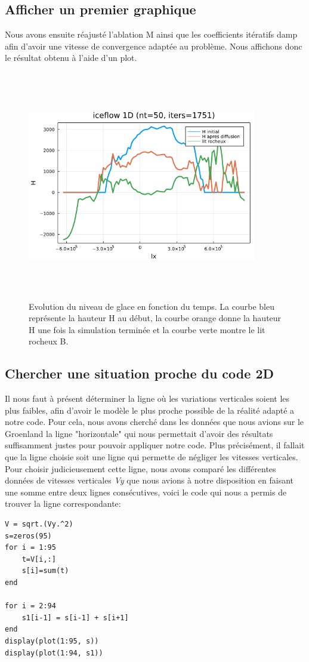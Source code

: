 \documentclass{article}
\begin{document}
\subsection{Afficher un premier graphique}
\vspace*{\fill}
Nous avons ensuite réajusté l'ablation M ainsi que les coefficients itératifs damp afin d'avoir une vitesse de convergence adaptée au problème.
Nous affichons donc le résultat obtenu à l'aide d'un plot.
\begin{figure}[!htpb]
\centering
\includegraphics[width=10cm, keepaspectratio=true, height=10cm]{Iceflow1D.png}
\caption{Evolution du niveau de glace en fonction du temps. La courbe bleu représente la hauteur H au début, la courbe orange donne la hauteur H une fois la simulation terminée et la courbe verte montre le lit rocheux B.}
\end{figure}
\vspace*{\fill}

\newpage
\subsection{Chercher une situation proche du code 2D}

Il nous faut à présent déterminer la ligne où les variations verticales soient les plus faibles, afin d'avoir le modèle le plus proche possible de la réalité adapté a notre code.
\newline
Pour cela, nous avons cherché dans les données que nous avions sur le Groenland la ligne "horizontale" qui nous permettait d'avoir des résultats suffisamment justes pour pouvoir appliquer notre code. Plus précisément, il fallait que la ligne choisie soit une ligne qui permette de négliger les vitesses verticales.
Pour choisir judicieusement cette ligne, nous avons comparé les différentes données de vitesses verticales \textit{Vy} que nous avions à notre disposition en faisant une somme entre deux lignes consécutives, voici le code qui nous a permis de trouver  la ligne correspondante: 
\begin{verbatim}
V = sqrt.(Vy.^2)
s=zeros(95)
for i = 1:95
    t=V[i,:]
    s[i]=sum(t)
end

for i = 2:94
    s1[i-1] = s[i-1] + s[i+1]
end
display(plot(1:95, s))
display(plot(1:94, s1))
\end{verbatim}
\end{document}
